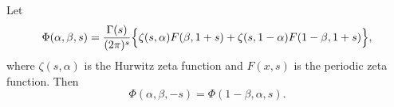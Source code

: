 Let
$$\Phi(\alpha, \beta, s) = \frac{\Gamma(s)}{(2\pi)^s} \Bigl\{ \zeta(s, \alpha) F(\beta, 1+s) + \zeta(s, 1-\alpha) F(1-\beta, 1+s) \Bigr\},$$
where $\zeta(s,\alpha)$ is the Hurwitz zeta function and $F(x,s)$ is the periodic zeta function. Then
$$\Phi(\alpha, \beta, -s) = \Phi(1 - \beta, \alpha, s).$$
